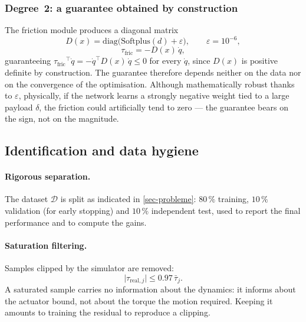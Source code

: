 \documentclass[a4paper, oneside]{article}
\newcommand{\qd}{\ensuremath{\dot{q}}}
\newcommand{\taufric}{\ensuremath{\tau_{\mathrm{fric}}}}
\newcommand{\Dset}{\ensuremath{\mathcal{D}}}
\begin{document}
\subsubsection{Degree~2: a guarantee obtained by construction}
\label{sec-frictionnet}

The friction module produces a diagonal matrix
%
\begin{equation}
    D(x) = \mathrm{diag}\bigl(\mathrm{Softplus}(d) + \varepsilon\bigr),
    \qquad \varepsilon = 10^{-6},
    \label{eq-Dmat}
\end{equation}
%
\begin{equation}
    \taufric = -D(x)\,\qd ,
    \label{eq-taufric}
\end{equation}
%
guaranteeing $\taufric^{\top}\qd = -\qd^{\top} D(x)\,\qd \le 0$ for every
$\qd$, since $D(x)$ is positive definite by construction. The guarantee
therefore depends neither on the data nor on the convergence of the
optimisation. Although mathematically robust thanks to $\varepsilon$,
physically, if the network learns a strongly negative weight tied to a large
payload $\delta$, the friction could artificially tend to zero --- the
guarantee bears on the sign, not on the magnitude.

\subsection{Identification and data hygiene}
\label{sec-donnees}

\paragraph{Rigorous separation.} The dataset $\Dset$ is split as indicated in
\cref{sec-probleme}: $80\,\%$ training, $10\,\%$ validation (for early
stopping) and $10\,\%$ independent test, used to report the final performance
and to compute the gains.

\paragraph{Saturation filtering.} Samples clipped by the simulator are removed:
%
\begin{equation}
    \bigl|\tau_{\mathrm{real},j}\bigr| \le \num{0.97}\,\bar{\tau}_j .
    \label{eq-satfilter}
\end{equation}
%
A saturated sample carries no information about the dynamics: it informs about
the actuator bound, not about the torque the motion required. Keeping it
amounts to training the residual to reproduce a clipping.
\end{document}
